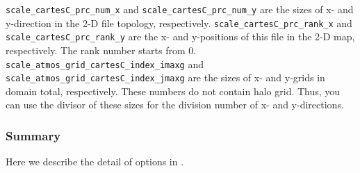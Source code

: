 
\verb|scale_cartesC_prc_num_x| and \verb|scale_cartesC_prc_num_y| are the sizes of x- and y-direction in the 2-D file topology, respectively. \verb|scale_cartesC_prc_rank_x| and \verb|scale_cartesC_prc_rank_y| are the x- and y-positions of this file in the 2-D map, respectively. The rank number starts from 0.
\verb|scale_atmos_grid_cartesC_index_imaxg| and \verb|scale_atmos_grid_cartesC_index_jmaxg| are the sizes of x- and y-grids in  domain total, respectively. These numbers do not contain halo grid. Thus, you can use the divisor of these sizes for the division number of x- and y-directions.

\subsubsection{Summary}

Here we describe the detail of options in .

